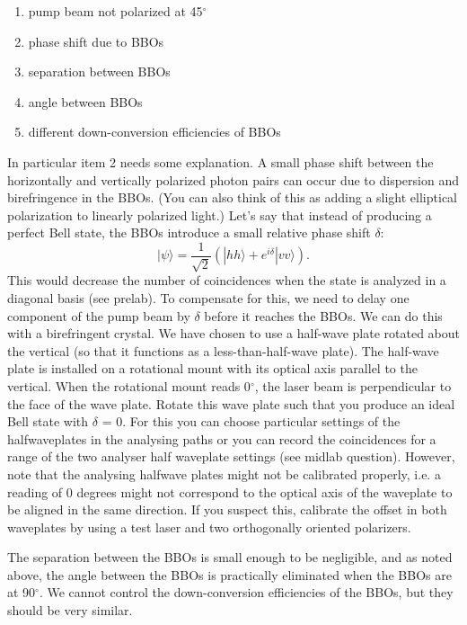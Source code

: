 \documentclass{../lab}
\begin{document}
\begin{enumerate}
    \item pump beam not polarized at 45$^\circ$

    \item phase shift due to BBOs

    \item separation between BBOs

    \item angle between BBOs

    \item different down-conversion efficiencies of BBOs
\end{enumerate}
In particular item 2 needs some explanation. A small phase shift between the horizontally and vertically polarized photon pairs can occur due to dispersion and birefringence in the BBOs. (You can also think of this as adding a slight elliptical polarization to linearly polarized light.) Let's say that instead of producing a perfect Bell state, the BBOs introduce a small relative phase shift $\delta$:
\begin{equation}
    |\psi\rangle = \frac{1}{\sqrt{2}} (|hh\rangle + e^{i\delta} |vv\rangle).
\end{equation}
This would decrease the number of coincidences when the state is analyzed in a diagonal basis (see prelab). To compensate for this, we need to delay one component of the pump beam by $\delta$ before it reaches the BBOs. We can do this with a birefringent crystal. We have chosen to use a half-wave plate rotated about the vertical (so that it functions as a less-than-half-wave plate). The half-wave plate is installed on a rotational mount with its optical axis parallel to the vertical. When the rotational mount reads 0$^\circ$, the laser beam is perpendicular to the face of the wave plate. Rotate this wave plate such that you produce an ideal Bell state with $\delta$ = 0. For this you can choose particular settings of the halfwaveplates in the analysing paths or you can record the coincidences for a range of the two analyser half waveplate settings (see midlab question). However, note that the analysing halfwave plates might not be calibrated properly, i.e. a reading of 0 degrees might not correspond to the optical axis of the waveplate to be aligned in the same direction. If you suspect this, calibrate the offset in both waveplates by using a test laser and two orthogonally oriented polarizers.

The separation between the BBOs is small enough to be negligible, and as noted above, the angle between the BBOs is practically eliminated when the BBOs are at 90$^\circ$. We cannot control the down-conversion efficiencies of the BBOs, but they should be very similar.
\end{document}
